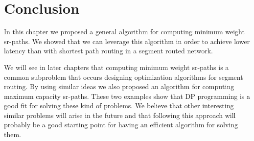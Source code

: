 % 

\section{Conclusion}

In this chapter we proposed a general algorithm for computing minimum weight sr-paths. We showed that we can leverage this 
algorithm in order to achieve lower latency than with shortest path routing in a segment routed network.

We will see in later chapters that computing minimum weight sr-paths is a common subproblem that occurs designing optimization
algorithms for segment routing. By using similar ideas we also proposed an algorithm for computing maximum capacity sr-paths. 
These two examples show that DP programming is a good fit for solving these kind of problems. We believe that other interesting
similar problems will arise in the future and that following this approach will probably be a good starting point
for having an efficient algorithm for solving them.

